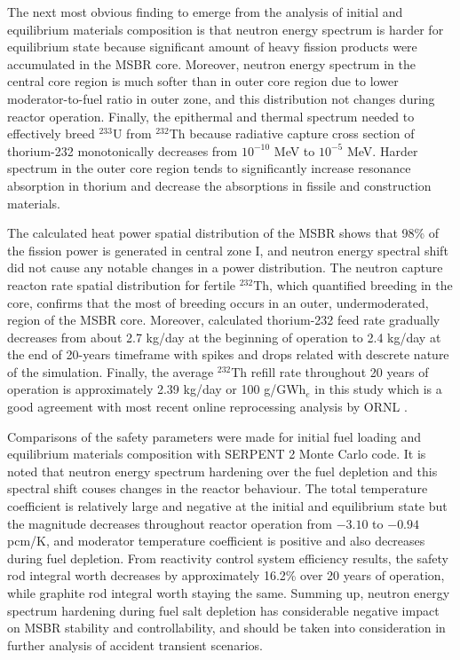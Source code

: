 The next most obvious finding to emerge from the analysis of initial and equilibrium materials composition is that neutron energy spectrum is harder for equilibrium state because significant amount of heavy fission products were accumulated in the \gls{MSBR} core. Moreover, neutron energy spectrum in the central core region is much softer than in outer core region due to lower moderator-to-fuel ratio in outer zone, and this distribution not changes during reactor operation. Finally, the epithermal and thermal spectrum needed to effectively breed $^{233}$U from $^{232}$Th because radiative capture cross section of thorium-232 monotonically decreases from $10^{-10}$ MeV to $10^{-5}$ MeV. Harder spectrum in the outer core region tends to significantly increase resonance absorption in thorium and decrease the absorptions in fissile and construction materials. 

The calculated heat power spatial distribution of the \gls{MSBR} shows that 98\% of the fission power is generated in central zone I, and neutron energy spectral shift did not cause any notable changes in a power distribution. The neutron capture reacton rate spatial distribution for fertile $^{232}$Th, which quantified breeding in the core, confirms that the most of breeding occurs in an outer, undermoderated, region of the \gls{MSBR} core. Moreover, calculated thorium-232 feed rate gradually decreases from about 2.7 kg/day at the beginning of operation to 2.4 kg/day at the end of 20-years timeframe with spikes and drops related with descrete nature of the simulation. Finally, the average $^{232}$Th refill rate throughout 20 years of operation is approximately 2.39 kg/day or 100 g/GWh$_e$ in this study which is a good agreement with most recent online reprocessing analysis by \gls{ORNL} \cite{betzler_molten_2017}.

Comparisons of the safety parameters were made for initial fuel loading and equilibrium materials composition with SERPENT 2 Monte Carlo code. It is noted that neutron energy spectrum hardening over the fuel depletion and this spectral shift couses changes in the reactor behaviour. The total temperature coefficient is relatively large and negative at the initial and equilibrium state but the magnitude decreases throughout reactor operation from $-3.10$ to $-0.94$ pcm/K, and moderator temperature coefficient is positive and also decreases during fuel depletion. From reactivity control system efficiency results, the safety rod integral worth decreases by approximately 16.2\% over 20 years of operation, while graphite rod integral worth staying the same. Summing up, neutron energy spectrum hardening during fuel salt depletion has considerable negative impact on \gls{MSBR} stability and controllability, and should be taken into consideration in further analysis of accident transient scenarios.

